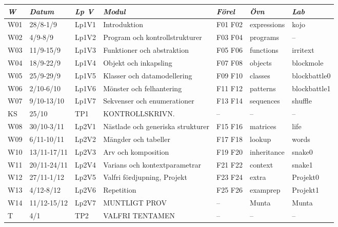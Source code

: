 \begin{tabular}{l|l|l|l|l|l|l}
\textit{W} & \textit{Datum} & \textit{Lp V} & \textit{Modul} & \textit{Förel} & \textit{Övn} & \textit{Lab} \\ \hline \hline
W01 & 28/8-1/9 & Lp1V1 & Introduktion & F01 F02 & expressions & kojo \\
W02 & 4/9-8/9 & Lp1V2 & Program och kontrollstrukturer & F03 F04 & programs & -- \\
W03 & 11/9-15/9 & Lp1V3 & Funktioner och abstraktion & F05 F06 & functions & irritext \\
W04 & 18/9-22/9 & Lp1V4 & Objekt och inkapsling & F07 F08 & objects & blockmole \\
W05 & 25/9-29/9 & Lp1V5 & Klasser och datamodellering & F09 F10 & classes & blockbattle0 \\
W06 & 2/10-6/10 & Lp1V6 & Mönster och felhantering & F11 F12 & patterns & blockbattle1 \\
W07 & 9/10-13/10 & Lp1V7 & Sekvenser och enumerationer & F13 F14 & sequences & shuffle \\
KS & 25/10 & TP1 & KONTROLLSKRIVN. & -- & -- & -- \\
W08 & 30/10-3/11 & Lp2V1 & Nästlade och generiska strukturer & F15 F16 & matrices & life \\
W09 & 6/11-10/11 & Lp2V2 & Mängder och tabeller & F17 F18 & lookup & words \\
W10 & 13/11-17/11 & Lp2V3 & Arv och komposition & F19 F20 & inheritance & snake0 \\
W11 & 20/11-24/11 & Lp2V4 & Varians och kontextparametrar & F21 F22 & context & snake1 \\
W12 & 27/11-1/12 & Lp2V5 & Valfri fördjupning, Projekt & F23 F24 & extra & Projekt0 \\
W13 & 4/12-8/12 & Lp2V6 & Repetition & F25 F26 & examprep & Projekt1 \\
W14 & 11/12-15/12 & Lp2V7 & MUNTLIGT PROV & -- & Munta & Munta \\
T & 4/1 & TP2 & VALFRI TENTAMEN & -- & -- & -- \\
\end{tabular}

